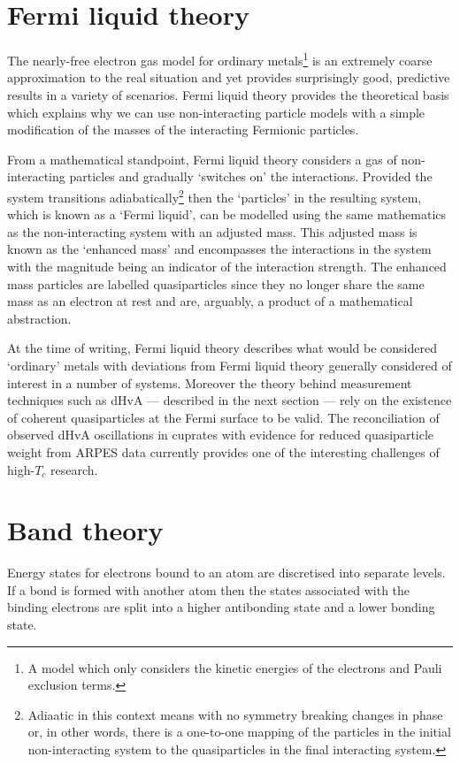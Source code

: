 

\section{Fermi liquid theory}
    \label{Sec:Theo:FermiLiquidTheory}

The nearly-free electron gas model for ordinary metals\footnote{A model which only considers the kinetic energies of the electrons and Pauli exclusion terms.} is an extremely coarse approximation to the real situation and yet provides surprisingly good, predictive results in a variety of scenarios. Fermi liquid theory provides the theoretical basis which explains why we can use non-interacting particle models with a simple modification of the masses of the interacting Fermionic particles.

From a mathematical standpoint, Fermi liquid theory considers a gas of non-interacting particles and gradually `switches on' the interactions. Provided the system transitions adiabatically\footnote{Adiaatic in this context means with no symmetry breaking changes in phase or, in other words, there is a one-to-one mapping of the particles in the initial non-interacting system to the quasiparticles in the final interacting system.} then the `particles' in the resulting system, which is known as a `Fermi liquid', can be modelled using the same mathematics as the non-interacting system with an adjusted mass. This adjusted mass is known as the `enhanced mass' and encompasses the interactions in the system with the magnitude being an indicator of the interaction strength. The enhanced mass particles are labelled quasiparticles since they no longer share the same mass as an electron at rest and are, arguably, a product of a mathematical abstraction.

At the time of writing, Fermi liquid theory describes what would be considered `ordinary' metals with deviations from Fermi liquid theory generally considered of interest in a number of systems. Moreover the theory behind measurement techniques such as \ac{dHvA} --- described in the next section --- rely on the existence of coherent quasiparticles at the Fermi surface to be valid. The reconciliation of observed \ac{dHvA} oscillations in cuprates with evidence for reduced quasiparticle weight from \ac{ARPES} data currently provides one of the interesting challenges of high-$T_c$ research.

\section{Band theory}
    \label{Sec:Theo:BandTheory}

Energy states for electrons bound to an atom are discretised into separate levels. If a bond is formed with another atom then the states associated with the binding electrons are split into a higher antibonding state and a lower bonding state. 
